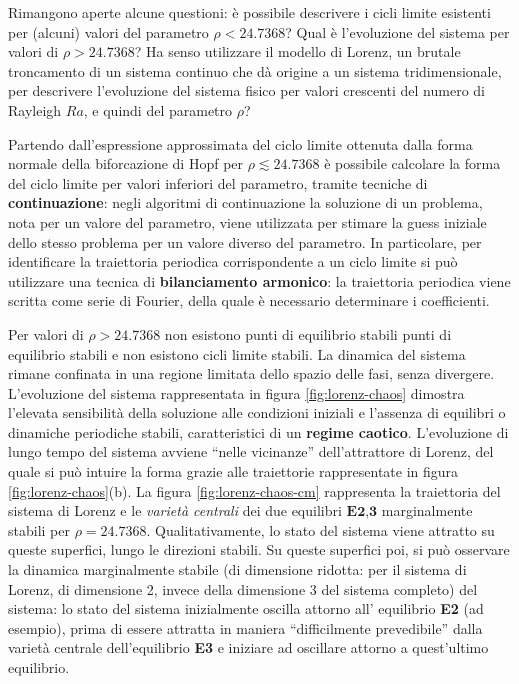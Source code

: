 \clearpage
\vspace{0.5cm}
\noindent
 Rimangono aperte alcune questioni: è possibile descrivere i cicli limite esistenti per (alcuni)
 valori del parametro $\rho < 24.7368$? Qual è l'evoluzione del sistema per valori
 di $\rho > 24.7368$? Ha senso utilizzare il modello di Lorenz, un brutale troncamento di
 un sistema continuo che dà origine a un sistema tridimensionale, per descrivere l'evoluzione
 del sistema fisico per valori crescenti del numero di Rayleigh $Ra$, e quindi del
 parametro $\rho$?

\vspace{0.3cm}
\noindent
Partendo dall'espressione approssimata del ciclo limite ottenuta dalla forma normale della
 biforcazione di Hopf per $\rho \lesssim 24.7368$ è possibile calcolare la forma del ciclo limite
 per valori inferiori del parametro, tramite tecniche di \textbf{continuazione}: negli algoritmi
 di continuazione la soluzione di un problema, nota per un valore del parametro, viene utilizzata
 per stimare la guess iniziale dello stesso problema per un valore diverso del parametro. 
In particolare, per identificare la traiettoria periodica corrispondente a un ciclo limite
 si può utilizzare una tecnica di \textbf{bilanciamento armonico}: la traiettoria periodica
 viene scritta come serie di Fourier, della quale è necessario determinare i coefficienti.

 
\vspace{0.3cm}
\noindent
Per valori di $\rho > 24.7368$ non esistono punti di equilibrio stabili punti di equilibrio
 stabili e non esistono cicli limite stabili. La dinamica del sistema rimane confinata 
 in una regione limitata dello spazio delle fasi, senza divergere.
L'evoluzione del sistema rappresentata in figura \ref{fig:lorenz-chaos} dimostra l'elevata
 sensibilità della soluzione alle condizioni 
 iniziali e l'assenza di equilibri o dinamiche periodiche stabili, caratteristici di un
 \textbf{regime caotico}. L'evoluzione di lungo tempo del sistema avviene ``nelle vicinanze''
 dell'attrattore di Lorenz, del quale si può intuire la forma grazie alle traiettorie
 rappresentate in figura \ref{fig:lorenz-chaos}(b).
La figura \ref{fig:lorenz-chaos-cm} rappresenta la traiettoria del sistema di Lorenz e le
 \textit{varietà centrali} dei due equilibri $\textbf{E2,3}$ marginalmente stabili 
 per $\rho = 24.7368$. Qualitativamente, lo stato del sistema viene attratto su queste
 superfici, lungo le direzioni stabili. Su queste superfici poi, si può osservare la dinamica
 marginalmente stabile (di dimensione ridotta: per il sistema di Lorenz, di dimensione 2, invece
 della dimensione 3 del sistema completo) del sistema: lo stato del sistema inizialmente
 oscilla attorno all' equilibrio \textbf{E2} (ad esempio),
 prima di essere attratta in maniera ``difficilmente prevedibile''
 dalla varietà centrale dell'equilibrio \textbf{E3} e iniziare ad oscillare attorno a 
 quest'ultimo equilibrio.

